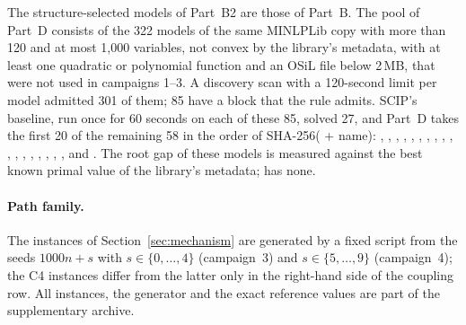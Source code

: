 \begin{sloppypar}
The structure-selected models of Part~B2 are those of Part~B. The pool of
Part~D consists of the 322 models of the same MINLPLib copy with more than 120
and at most 1{,}000 variables, not convex by the library's metadata, with at
least one quadratic or polynomial function and an OSiL file below 2\,MB, that
were not used in campaigns 1--3. A discovery scan with a 120-second limit per
model admitted 301 of them; 85 have a block that the  rule admits.
SCIP's baseline, run once for 60 seconds on each of these 85, solved 27, and
Part~D takes the first 20 of the remaining 58 in the order of
SHA-256( + name): ,
, ,
, , ,
, , , ,
, , ,
, ,
, , ,
 and . The root gap of these models
is measured against the best known primal value of the library's metadata;
 has none.
\end{sloppypar}

\paragraph{Path family.} The instances of Section~\ref{sec:mechanism} are
generated by a fixed script from the seeds $1000n+s$ with $s\in\{0,\dots,4\}$
(campaign~3) and $s\in\{5,\dots,9\}$ (campaign~4); the C4 instances differ from
the latter only in the right-hand side of the coupling row. All instances, the
generator and the exact reference values are part of the supplementary archive.
